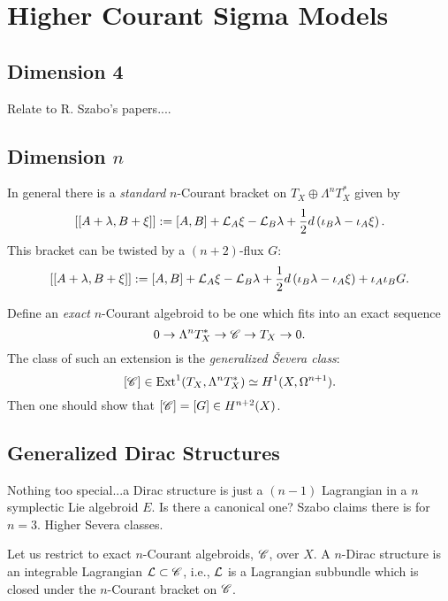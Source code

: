 \section{Higher Courant Sigma Models}

\subsection{Dimension 4}

Relate to R. Szabo's papers....

\subsection{Dimension $n$}

In general there is a {\it standard} $n$-Courant bracket on $T_X \oplus \Lambda^{n} T^\ast_X$ given by
\[
[[A + \lambda , B + \xi]]:=[A,B]+ \mathcal L_A \xi - \mathcal L_B \lambda +\frac{1}{2} d \left ( \iota_B \lambda - \iota_A \xi \right ).
\]
This bracket can be twisted by a $(n+2)$-flux $G$:
\[
[[A + \lambda , B + \xi]]:=[A,B]+ \mathcal L_A \xi - \mathcal L_B \lambda +\frac{1}{2} d \left ( \iota_B \lambda - \iota_A \xi \right ) + \iota_A \iota_B G.
\]

Define an {\it exact} $n$-Courant algebroid to be one which fits into an exact sequence
\[
0 \to \Lambda^n T^\ast_X \to \mathscr C \to T_X \to 0.
\]
The class of such an extension is the {\it generalized \v{S}evera class}:
\[
[\mathscr C] \in \mathrm{Ext}^1 (T_X , \Lambda^n T^\ast_X) \simeq H^1 (X, \Omega^{n+1}).
\]
Then one should show that $[\mathscr C] = [G] \in H^{n+2} (X)$.





\subsection{Generalized Dirac Structures}

Nothing too special...a Dirac structure is just a $(n-1)$ Lagrangian in a $n$ symplectic Lie algebroid $E$.  Is there a canonical one? Szabo claims there is for $n=3$. Higher Severa classes.


Let us restrict to exact $n$-Courant algebroids, $\mathscr C$, over $X$. A $n$-Dirac structure is an integrable Lagrangian $\mathcal L \subset \mathscr C$, i.e., $\mathcal L$ is a Lagrangian subbundle which is closed under the $n$-Courant bracket on $\mathscr C$.

